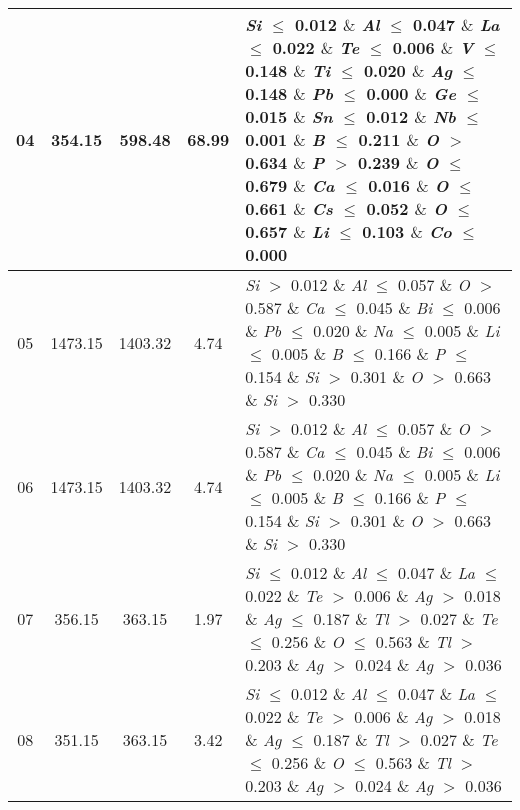 \begin{table}[!htbp]
\begin{tabular}{ccccp{}}
		\hline
		04 & 354.15 & 598.48 & 68.99 & \textit{Si} $\le$ 0.012 $\&$ \textit{Al} $\le$ 0.047 $\&$ \textit{La} $\le$ 0.022 $\&$ \textit{Te} $\le$ 0.006 $\&$ \textit{V} $\le$ 0.148 $\&$ \textit{Ti} $\le$ 0.020 $\&$ \textit{Ag} $\le$ 0.148 $\&$ \textit{Pb} $\le$ 0.000 $\&$ \textit{Ge} $\le$ 0.015 $\&$ \textit{Sn} $\le$ 0.012 $\&$ \textit{Nb} $\le$ 0.001 $\&$ \textit{B} $\le$ 0.211 $\&$ \textit{O} $>$ 0.634 $\&$ \textit{P} $>$ 0.239 $\&$ \textit{O} $\le$ 0.679 $\&$ \textit{Ca} $\le$ 0.016 $\&$ \textit{O} $\le$ 0.661 $\&$ \textit{Cs} $\le$ 0.052 $\&$ \textit{O} $\le$ 0.657 $\&$ \textit{Li} $\le$ 0.103 $\&$ \textit{Co} $\le$ 0.000\\
		\hline
		05 & 1473.15 & 1403.32 & 4.74 & \textit{Si} $>$ 0.012 $\&$ \textit{Al} $\le$ 0.057 $\&$ \textit{O} $>$ 0.587 $\&$ \textit{Ca} $\le$ 0.045 $\&$ \textit{Bi} $\le$ 0.006 $\&$ \textit{Pb} $\le$ 0.020 $\&$ \textit{Na} $\le$ 0.005 $\&$ \textit{Li} $\le$ 0.005 $\&$ \textit{B} $\le$ 0.166 $\&$ \textit{P} $\le$ 0.154 $\&$ \textit{Si} $>$ 0.301 $\&$ \textit{O} $>$ 0.663 $\&$ \textit{Si} $>$ 0.330\\
		\hline
		06 & 1473.15 & 1403.32 & 4.74 & \textit{Si} $>$ 0.012 $\&$ \textit{Al} $\le$ 0.057 $\&$ \textit{O} $>$ 0.587 $\&$ \textit{Ca} $\le$ 0.045 $\&$ \textit{Bi} $\le$ 0.006 $\&$ \textit{Pb} $\le$ 0.020 $\&$ \textit{Na} $\le$ 0.005 $\&$ \textit{Li} $\le$ 0.005 $\&$ \textit{B} $\le$ 0.166 $\&$ \textit{P} $\le$ 0.154 $\&$ \textit{Si} $>$ 0.301 $\&$ \textit{O} $>$ 0.663 $\&$ \textit{Si} $>$ 0.330\\
		\hline
		07 & 356.15 & 363.15 & 1.97 & \textit{Si} $\le$ 0.012 $\&$ \textit{Al} $\le$ 0.047 $\&$ \textit{La} $\le$ 0.022 $\&$ \textit{Te} $>$ 0.006 $\&$ \textit{Ag} $>$ 0.018 $\&$ \textit{Ag} $\le$ 0.187 $\&$ \textit{Tl} $>$ 0.027 $\&$ \textit{Te} $\le$ 0.256 $\&$ \textit{O} $\le$ 0.563 $\&$ \textit{Tl} $>$ 0.203 $\&$ \textit{Ag} $>$ 0.024 $\&$ \textit{Ag} $>$ 0.036\\
		\hline
		08 & 351.15 & 363.15 & 3.42 & \textit{Si} $\le$ 0.012 $\&$ \textit{Al} $\le$ 0.047 $\&$ \textit{La} $\le$ 0.022 $\&$ \textit{Te} $>$ 0.006 $\&$ \textit{Ag} $>$ 0.018 $\&$ \textit{Ag} $\le$ 0.187 $\&$ \textit{Tl} $>$ 0.027 $\&$ \textit{Te} $\le$ 0.256 $\&$ \textit{O} $\le$ 0.563 $\&$ \textit{Tl} $>$ 0.203 $\&$ \textit{Ag} $>$ 0.024 $\&$ \textit{Ag} $>$ 0.036\\
		\hline

\end{tabular}
\end{table}
